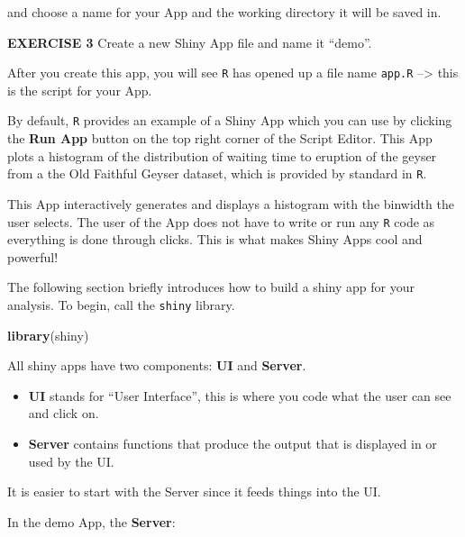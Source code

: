 \documentclass[
]{article}
\newenvironment{Shaded}{\begin{snugshade}}{\end{snugshade}}
\newcommand{\KeywordTok}[1]{\textcolor[rgb]{0.13,0.29,0.53}{\textbf{#1}}}
\newcommand{\NormalTok}[1]{#1}
\begin{document}
and choose a name for your App and the working directory it will be
saved in.

\textbf{EXERCISE 3} Create a new Shiny App file and name it ``demo''.

After you create this app, you will see \texttt{R} has opened up a file
name \texttt{app.R} --\textgreater{} this is the script for your App.

By default, \texttt{R} provides an example of a Shiny App which you can
use by clicking the \textbf{Run App} button on the top right corner of
the Script Editor. This App plots a histogram of the distribution of
waiting time to eruption of the geyser from a the Old Faithful Geyser
dataset, which is provided by standard in \texttt{R}.

This App interactively generates and displays a histogram with the
binwidth the user selects. The user of the App does not have to write or
run any \texttt{R} code as everything is done through clicks. This is
what makes Shiny Apps cool and powerful!

The following section briefly introduces how to build a shiny app for
your analysis. To begin, call the \texttt{shiny} library.

\begin{Shaded}
\begin{Highlighting}[]
\KeywordTok{library}\NormalTok{(shiny)}
\end{Highlighting}
\end{Shaded}

All shiny apps have two components: \textbf{UI} and \textbf{Server}.

\begin{itemize}
\item
  \textbf{UI} stands for ``User Interface'', this is where you code what
  the user can see and click on.
\item
  \textbf{Server} contains functions that produce the output that is
  displayed in or used by the UI.
\end{itemize}

It is easier to start with the Server since it feeds things into the UI.

In the demo App, the \textbf{Server}:
\end{document}
